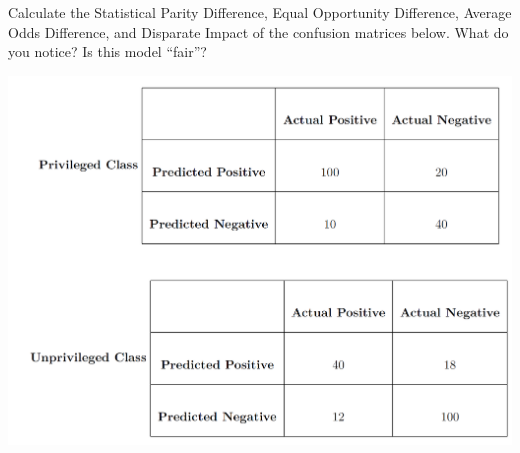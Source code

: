 \documentclass[assignment03_Solutions]{subfiles}
\begin{document}
\begin{exercise}[(40 Minutes)]
\bes
\item Calculate the Statistical Parity Difference, Equal Opportunity Difference, Average Odds Difference, and Disparate Impact of the confusion matrices below. What do you notice? Is this model ``fair''?

\begin{center}
\includegraphics[width=0.8\linewidth]{figures/confusionPrivUnpriv}
\end{center}



\end{exercise}
\end{document}
